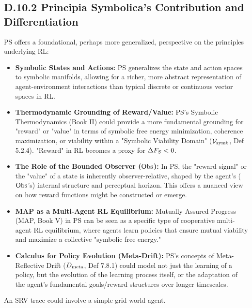 \subsection*{D.10.2 Principia Symbolica's Contribution and Differentiation} \label{subsec:appD_rl_contribution_differentiation}
PS offers a foundational, perhaps more generalized, perspective on the principles underlying RL:
\begin{itemize}
    \item \textbf{Symbolic States and Actions:} PS generalizes the state and action spaces to symbolic manifolds, allowing for a richer, more abstract representation of agent-environment interactions than typical discrete or continuous vector spaces in RL.
    \item \textbf{Thermodynamic Grounding of Reward/Value:} PS's Symbolic Thermodynamics (Book II) could provide a more fundamental grounding for "reward" or "value" in terms of symbolic free energy minimization, coherence maximization, or viability within a "Symbolic Viability Domain" (\(\mathcal{V}_{\mathrm{symb}}\), Def 5.2.4). "Reward" in RL becomes a proxy for \(\Delta F_S < 0\).
    \item \textbf{The Role of the Bounded Observer (\(\mathrm{Obs}\)):} In PS, the "reward signal" or the "value" of a state is inherently observer-relative, shaped by the agent's (\(\mathrm{Obs}\)'s) internal structure and perceptual horizon. This offers a nuanced view on how reward functions might be constructed or emerge.
    \item \textbf{MAP as a Multi-Agent RL Equilibrium:} Mutually Assured Progress (MAP, Book V) in PS can be seen as a specific type of cooperative multi-agent RL equilibrium, where agents learn policies that ensure mutual viability and maximize a collective "symbolic free energy."
    \item \textbf{Calculus for Policy Evolution (Meta-Drift):} PS's concepts of Meta-Reflective Drift (\(D_{\mathrm{meta}}\), Def 7.8.1) could model not just the learning of a policy, but the evolution of the learning process itself, or the adaptation of the agent's fundamental goals/reward structures over longer timescales.
\end{itemize}
An SRV trace could involve a simple grid-world agent.
